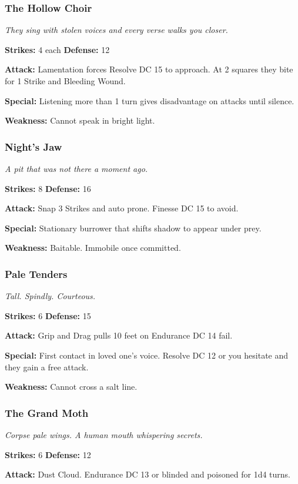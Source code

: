 \documentclass[10pt,twoside]{article}
\begin{document}
\subsubsection{The Hollow Choir}
\textit{They sing with stolen voices and every verse walks you closer.}

\textbf{Strikes:} 4 each \quad \textbf{Defense:} 12

\textbf{Attack:} Lamentation forces Resolve DC 15 to approach. At 2 squares they bite for 1 Strike and Bleeding Wound.

\textbf{Special:} Listening more than 1 turn gives disadvantage on attacks until silence.

\textbf{Weakness:} Cannot speak in bright light.

\subsubsection{Night's Jaw}
\textit{A pit that was not there a moment ago.}

\textbf{Strikes:} 8 \quad \textbf{Defense:} 16

\textbf{Attack:} Snap 3 Strikes and auto prone. Finesse DC 15 to avoid.

\textbf{Special:} Stationary burrower that shifts shadow to appear under prey.

\textbf{Weakness:} Baitable. Immobile once committed.

\subsubsection{Pale Tenders}
\textit{Tall. Spindly. Courteous.}

\textbf{Strikes:} 6 \quad \textbf{Defense:} 15

\textbf{Attack:} Grip and Drag pulls 10 feet on Endurance DC 14 fail.

\textbf{Special:} First contact in loved one's voice. Resolve DC 12 or you hesitate and they gain a free attack.

\textbf{Weakness:} Cannot cross a salt line.

\subsubsection{The Grand Moth}
\textit{Corpse pale wings. A human mouth whispering secrets.}

\textbf{Strikes:} 6 \quad \textbf{Defense:} 12

\textbf{Attack:} Dust Cloud. Endurance DC 13 or blinded and poisoned for 1d4 turns.
\end{document}
